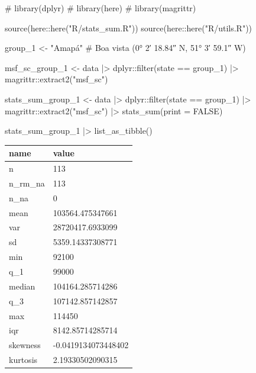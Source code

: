\documentclass[
  12pt,
  a4paper,
  oneside]{tesesusp}
\newenvironment{Shaded}{\begin{snugshade}}{\end{snugshade}}
\newcommand{\AttributeTok}[1]{\textcolor[rgb]{0.40,0.45,0.13}{#1}}
\newcommand{\CommentTok}[1]{\textcolor[rgb]{0.37,0.37,0.37}{#1}}
\newcommand{\ConstantTok}[1]{\textcolor[rgb]{0.56,0.35,0.01}{#1}}
\newcommand{\FunctionTok}[1]{\textcolor[rgb]{0.28,0.35,0.67}{#1}}
\newcommand{\NormalTok}[1]{\textcolor[rgb]{0.00,0.23,0.31}{#1}}
\newcommand{\OtherTok}[1]{\textcolor[rgb]{0.00,0.23,0.31}{#1}}
\newcommand{\SpecialCharTok}[1]{\textcolor[rgb]{0.37,0.37,0.37}{#1}}
\newcommand{\StringTok}[1]{\textcolor[rgb]{0.13,0.47,0.30}{#1}}
\begin{document}
\begin{Shaded}
\begin{Highlighting}[numbers=left,,]
\CommentTok{\# library(dplyr)}
\CommentTok{\# library(here)}
\CommentTok{\# library(magrittr)}

\FunctionTok{source}\NormalTok{(here}\SpecialCharTok{::}\FunctionTok{here}\NormalTok{(}\StringTok{"R/stats\_sum.R"}\NormalTok{))}
\FunctionTok{source}\NormalTok{(here}\SpecialCharTok{::}\FunctionTok{here}\NormalTok{(}\StringTok{"R/utils.R"}\NormalTok{))}

\NormalTok{group\_1 }\OtherTok{\textless{}{-}} \StringTok{"Amapá"} \CommentTok{\# Boa vista (0° 2′ 18.84″ N, 51° 3′ 59.1″ W)}

\NormalTok{msf\_sc\_group\_1 }\OtherTok{\textless{}{-}} 
\NormalTok{  data }\SpecialCharTok{|\textgreater{}}
\NormalTok{  dplyr}\SpecialCharTok{::}\FunctionTok{filter}\NormalTok{(state }\SpecialCharTok{==}\NormalTok{ group\_1) }\SpecialCharTok{|\textgreater{}}
\NormalTok{  magrittr}\SpecialCharTok{::}\FunctionTok{extract2}\NormalTok{(}\StringTok{"msf\_sc"}\NormalTok{)}

\NormalTok{stats\_sum\_group\_1 }\OtherTok{\textless{}{-}} 
\NormalTok{  data }\SpecialCharTok{|\textgreater{}} 
\NormalTok{  dplyr}\SpecialCharTok{::}\FunctionTok{filter}\NormalTok{(state }\SpecialCharTok{==}\NormalTok{ group\_1) }\SpecialCharTok{|\textgreater{}}
\NormalTok{  magrittr}\SpecialCharTok{::}\FunctionTok{extract2}\NormalTok{(}\StringTok{"msf\_sc"}\NormalTok{) }\SpecialCharTok{|\textgreater{}} 
  \FunctionTok{stats\_sum}\NormalTok{(}\AttributeTok{print =} \ConstantTok{FALSE}\NormalTok{)}

\NormalTok{stats\_sum\_group\_1 }\SpecialCharTok{|\textgreater{}} \FunctionTok{list\_as\_tibble}\NormalTok{()}
\end{Highlighting}
\end{Shaded}

\begin{table}
\centering
\begin{tabular}{l|l}
\hline
name & value\\
\hline
n & 113\\
\hline
n\_rm\_na & 113\\
\hline
n\_na & 0\\
\hline
mean & 103564.475347661\\
\hline
var & 28720417.6933099\\
\hline
sd & 5359.14337308771\\
\hline
min & 92100\\
\hline
q\_1 & 99000\\
\hline
median & 104164.285714286\\
\hline
q\_3 & 107142.857142857\\
\hline
max & 114450\\
\hline
iqr & 8142.85714285714\\
\hline
skewness & -0.0419134073448402\\
\hline
kurtosis & 2.19330502090315\\
\hline
\end{tabular}
\end{table}
\end{document}
